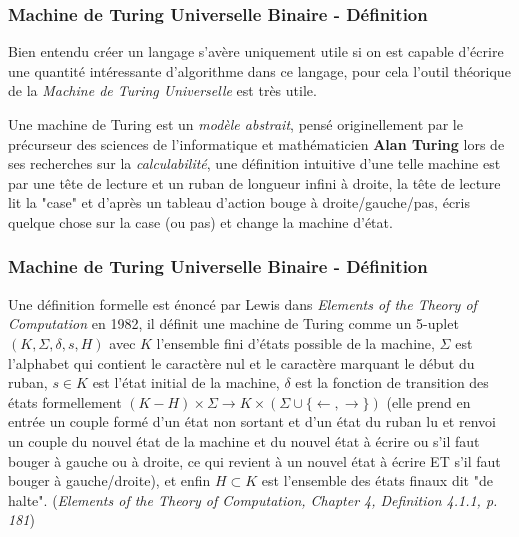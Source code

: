 \documentclass{beamer}
\begin{document}
    \begin{frame}[allowframebreaks]
        \frametitle{Machine de Turing Universelle Binaire - Définition}
        Bien entendu créer un langage s'avère uniquement utile si on est capable d'écrire une quantité intéressante d'algorithme dans 
        ce langage, pour cela l'outil théorique de la \textit{Machine de Turing Universelle} est très utile.\newline

        \pause
        
        Une machine de Turing est un \textit{modèle abstrait}, pensé originellement par le précurseur des sciences de l'informatique 
        et mathématicien \textbf{Alan Turing} lors de ses recherches sur la \textit{calculabilité}, une définition intuitive d'une telle machine 
        est par une tête de lecture et un ruban de longueur infini à droite, la tête de lecture lit la "case" et d'après un tableau d'action bouge à droite/gauche/pas, écris 
        quelque chose sur la case (ou pas) et change la machine d'état.\newline 
    \end{frame}

    \begin{frame}
        \frametitle{Machine de Turing Universelle Binaire - Définition}
        Une définition formelle est énoncé par Lewis dans \textit{Elements of the Theory of Computation} en 1982, il définit une machine de Turing 
        comme un 5-uplet $(K,\Sigma,\delta,s,H)$ avec $K$ l'ensemble fini d'états possible de la machine, $\Sigma$ est l'alphabet qui contient 
        le caractère nul et le caractère marquant le début du ruban, $s \in K$ est l'état initial de la machine, $\delta$ est la fonction 
        de transition des états formellement $(K - H) \times \Sigma \to K \times (\Sigma \cup \{\leftarrow,\rightarrow\})$
        (elle prend en entrée un couple formé d'un état non sortant et d'un état du ruban lu et 
        renvoi un couple du nouvel état de la machine et du nouvel état à écrire ou s'il faut bouger à gauche ou à droite, ce qui 
        revient à un nouvel état à écrire ET s'il faut bouger à gauche/droite), et enfin $H \subset K$ est l'ensemble des états 
        finaux dit "de halte". (\textit{Elements of the Theory of Computation, Chapter 4, Definition 4.1.1, p. 181})\newline
    \end{frame}
\end{document}
